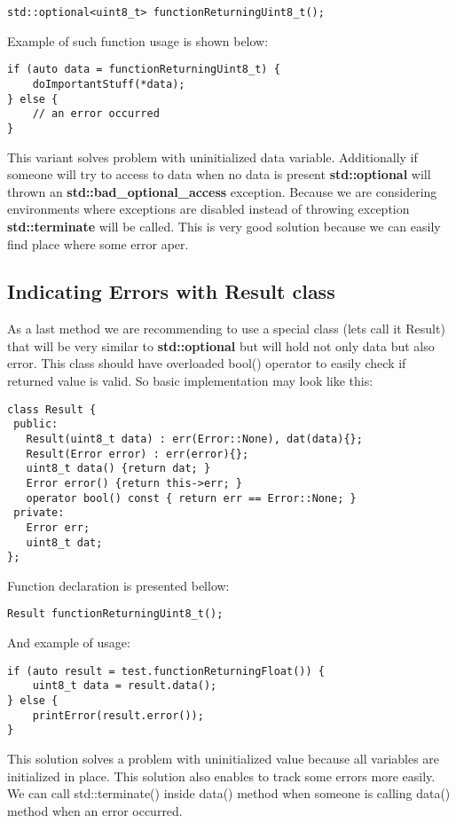 \documentclass{article}
\let\Oldsubsection\subsection
\renewcommand{\subsection}{\FloatBarrier\Oldsubsection}
\begin{document}
\begin{lstlisting}
std::optional<uint8_t> functionReturningUint8_t();
\end{lstlisting}

Example of such function usage is shown below:
\begin{lstlisting}
if (auto data = functionReturningUint8_t) {
    doImportantStuff(*data);
} else {
    // an error occurred
}
\end{lstlisting}

This variant solves problem with uninitialized data variable. Additionally if someone will try to access to data when no data is present \textbf{std::optional} will thrown an \textbf{std::bad\_optional\_access} exception. Because we are considering environments where exceptions are disabled instead of throwing exception \textbf{std::terminate} will be called. This is very good solution because we can easily find place where some error aper. 

\subsection{Indicating Errors with Result class}
As a last method we are recommending to use a special class (lets call it Result) that will be very similar to \textbf{
std::optional} but will hold not only data but also error. This class should have overloaded bool() operator to easily check if returned value is valid. So basic implementation may look like this:
\begin{lstlisting}
class Result {
 public:
   Result(uint8_t data) : err(Error::None), dat(data){};   
   Result(Error error) : err(error){};
   uint8_t data() {return dat; }
   Error error() {return this->err; }
   operator bool() const { return err == Error::None; }
 private:
   Error err;
   uint8_t dat;
};
\end{lstlisting}

Function declaration is presented bellow:
\begin{lstlisting}
Result functionReturningUint8_t();
\end{lstlisting}

And example of usage:
\begin{lstlisting}
if (auto result = test.functionReturningFloat()) {
    uint8_t data = result.data();
} else {
    printError(result.error());
}
\end{lstlisting}

This solution solves a problem with uninitialized value because all variables are initialized in place. This solution also enables to track some errors more easily. We can call std::terminate() inside data() method when someone is calling data() method when an error occurred.
\end{document}

